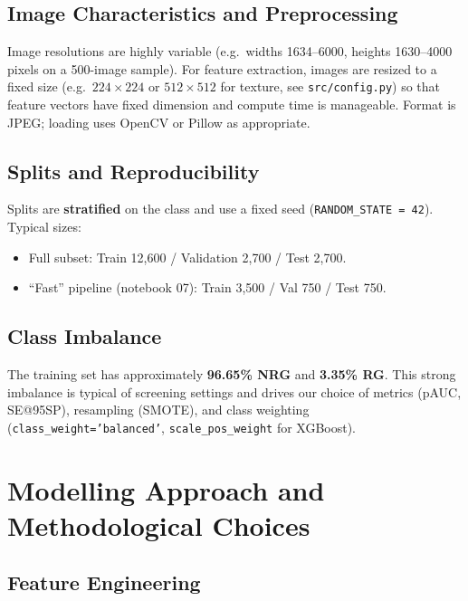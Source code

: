 \documentclass[11pt,a4paper]{article}
\begin{document}
\subsection{Image Characteristics and Preprocessing}

Image resolutions are highly variable (e.g.\ widths 1634--6000, heights 1630--4000 pixels on a 500-image sample). For feature extraction, images are resized to a fixed size (e.g.\ $224\times224$ or $512\times512$ for texture, see \texttt{src/config.py}) so that feature vectors have fixed dimension and compute time is manageable. Format is JPEG; loading uses OpenCV or Pillow as appropriate.

\subsection{Splits and Reproducibility}

Splits are \textbf{stratified} on the class and use a fixed seed (\texttt{RANDOM\_STATE = 42}). Typical sizes:
\begin{itemize}
  \item Full subset: Train 12,600 / Validation 2,700 / Test 2,700.
  \item ``Fast'' pipeline (notebook 07): Train 3,500 / Val 750 / Test 750.
\end{itemize}

\subsection{Class Imbalance}

The training set has approximately \textbf{96.65\% NRG} and \textbf{3.35\% RG}. This strong imbalance is typical of screening settings and drives our choice of metrics (pAUC, SE@95SP), resampling (SMOTE), and class weighting (\texttt{class\_weight='balanced'}, \texttt{scale\_pos\_weight} for XGBoost).

\section{Modelling Approach and Methodological Choices}

\subsection{Feature Engineering}
\end{document}
